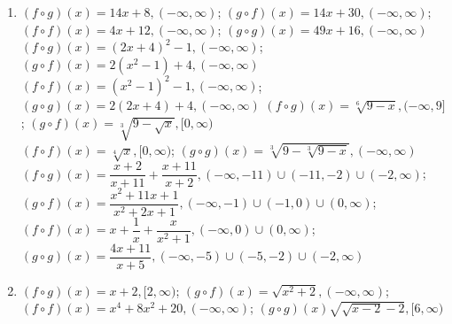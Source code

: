 \documentclass{book}
\begin{document}
\begin{appendices}
\begin{enumerate}[!HW!]
\item $(f\circ g)(x) = 14x+8, (-\infty,\infty)$; \quad $(g\circ f)(x) = 14x+30, (-\infty,\infty)$;\\
$(f\circ f)(x) = 4x+12, (-\infty,\infty)$; \quad $(g\circ g)(x) = 49x+16, (-\infty,\infty)$
\itemspade $(f\circ g)(x) = (2x+4)^2-1, (-\infty,\infty)$;\quad $(g\circ f)(x) = 2(x^2-1)+4, (-\infty,\infty)$\\
$(f\circ f)(x)  = (x^2-1)^2-1,  (-\infty,\infty)$; \quad $(g\circ g)(x) = 2(2x+4)+4, (-\infty,\infty)$
\itemspade $(f\circ g)(x) = \sqrt[6]{9-x}, (-\infty,9]$; \quad $(g\circ f)(x) = \sqrt[3]{9-\sqrt{x}}, [0,\infty)$\\
$(f\circ f)(x)  = \sqrt[4]{x},  [0,\infty)$; \quad $(g\circ g)(x) = \sqrt[3]{9-\sqrt[3]{9-x}}, (-\infty,\infty)$
\itemspade $(f\circ g)(x) = \dfrac{x+2}{x+11}+\dfrac{x+11}{x+2}, (-\infty,-11)\cup(-11,-2)\cup(-2,\infty)$; \\ 
$(g\circ f)(x) = \dfrac{x^2+11x+1}{x^2+2x+1}, (-\infty,-1)\cup(-1,0)\cup(0,\infty)$;\\
$(f\circ f)(x)  = x+\dfrac{1}{x}+\dfrac{x}{x^2+1},  (-\infty,0)\cup(0,\infty)$; $(g\circ g)(x) = \dfrac{4x+11}{x+5}, (-\infty,-5)\cup(-5,-2)\cup(-2,\infty)$
\item $(f\circ g)(x) = x+2, [2,\infty)$; \quad $(g\circ f)(x) = \sqrt{x^2+2}, (-\infty,\infty)$;\\
$(f\circ f)(x) = x^4+8x^2+20, (-\infty,\infty)$; \quad $(g\circ g)(x) \sqrt{\sqrt{x-2}-2}, [6,\infty)$

\end{enumerate}
\vspace{-15 pt}


\end{appendices}
\end{document}
